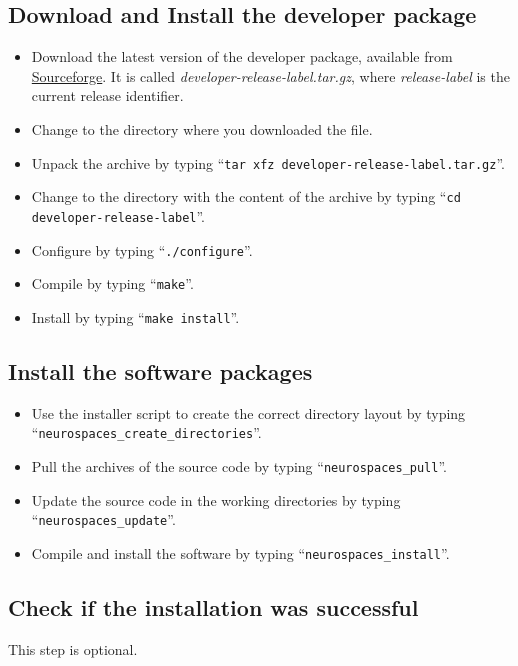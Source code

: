 \documentclass[12pt]{article}
\begin{document}
\subsection*{Download and Install the developer package}

\begin{itemize}
   \item[] Download the latest version of the developer package, available from \href{http://sourceforge.net/projects/neurospaces/files/}{Sourceforge}. It is called {\it developer-release-label.tar.gz}, where {\it release-label} is the current release identifier.
   \item[] Change to the directory where you downloaded the file.
   \item[] Unpack the archive by typing ``{\tt tar xfz developer-release-label.tar.gz}''.
   \item[] Change to the directory with the content of the archive by typing ``{\tt cd developer-release-label}''.
   \item[] Configure by typing ``{\tt ./configure}''.
   \item[] Compile by typing ``{\tt make}''.
   \item[] Install by typing ``{\tt make install}''. 
\end{itemize}

\subsection*{Install the software packages}

\begin{itemize}
   \item[] Use the installer script to create the correct directory layout by typing ``{\tt neurospaces\_create\_directories}''.
   \item[] Pull the archives of the source code by typing ``{\tt neurospaces\_pull}''.
   \item[] Update the source code in the working directories by typing ``{\tt neurospaces\_update}''.
   \item[] Compile and install the software by typing ``{\tt neurospaces\_install}''.
\end{itemize}

\subsection*{Check if the installation was successful}

This step is optional.
\end{document}

